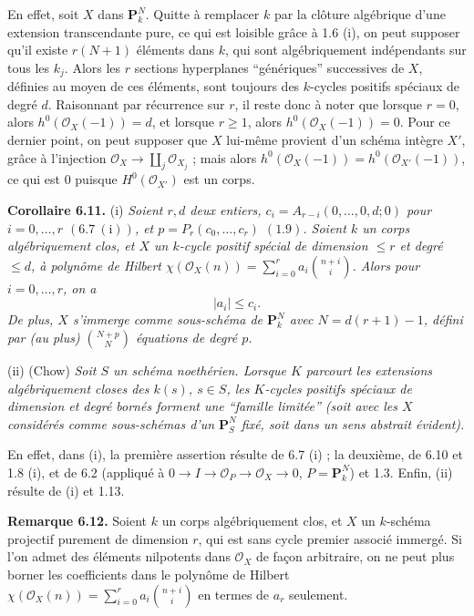 En
effet, soit $X$ dans $\mathbf P^N_k$. Quitte \`a remplacer $k$ par la cl\^oture alg\'ebrique d'une extension transcendante pure, ce qui est loisible gr\^ace \`a 1.6 (i), on peut supposer qu'il existe $r(N+1)$ \'el\'ements dans $k$, qui sont alg\'ebriquement ind\'ependants sur tous les $k_j$. Alors les $r$ sections hyperplanes ``g\'en\'eriques'' successives de $X$, d\'efinies au moyen de ces \'el\'ements, sont toujours des $k$-cycles positifs sp\'eciaux de degr\'e $d$. Raisonnant par r\'ecurrence sur $r$, il reste donc \`a noter que lorsque $r=0$, alors $h^0(\mathcal O_X(-1))=d$, et lorsque $r\ge1$, alors $h^0(\mathcal O_X(-1))=0$. Pour ce dernier point, on peut supposer que $X$ lui-m\^eme provient d'un sch\'ema int\`egre $X'$, gr\^ace \`a l'injection $\mathcal O_X\to \coprod_j\mathcal O_{X_j}$ ; mais alors $h^0(\mathcal O_X(-1))=h^0(\mathcal O_{X'}(-1))$, ce qui est $0$ puisque $H^0(\mathcal O_{X'})$ est un corps.

\textbf{Corollaire 6.11.} (i) \emph{Soient $r,d$ deux entiers, $c_i=A_{r-i}(0,\ldots,0,d;0)$ pour $i=0,\ldots,r$ $(6.7\ \mathrm{(i)})$, et $p=P_r(c_0,\ldots,c_r)$ $(1.9)$. Soient $k$ un corps alg\'ebriquement clos, et $X$ un $k$-cycle positif sp\'ecial de dimension $\le r$ et degr\'e $\le d$, \`a polyn\^ome de Hilbert $\chi(\mathcal O_X(n))=\sum_{i=0}^{r}a_i\binom{n+i}{i}$. Alors pour $i=0,\ldots,r$, on a}
\[
   |a_i|\le c_i.
\]
\emph{De plus, $X$ s'immerge comme sous-sch\'ema de $\mathbf P^N_k$ avec $N=d(r+1)-1$, d\'efini par (au plus) $\binom{N+p}{N}$ \'equations de degr\'e $p$.}

(ii) (Chow) \emph{Soit $S$ un sch\'ema noeth\'erien. Lorsque $K$ parcourt les extensions alg\'ebriquement closes des $k(s)$, $s\in S$, les $K$-cycles positifs sp\'eciaux de dimension et degr\'e born\'es forment une ``famille limit\'ee'' (soit avec les $X$ consid\'er\'es comme sous-sch\'emas d'un $\mathbf P^N_S$ fix\'e, soit dans un sens abstrait \'evident).}

En
effet, dans (i), la premi\`ere assertion r\'esulte de 6.7 (i) ; la deuxi\`eme, de 6.10 et 1.8 (i), et de 6.2 (appliqu\'e \`a $0\to I\to\mathcal O_P\to\mathcal O_X\to0$, $P=\mathbf P^N_k$) et 1.3. Enfin, (ii) r\'esulte de (i) et 1.13.

\textbf{Remarque 6.12.} Soient $k$ un corps alg\'ebriquement clos, et $X$ un $k$-sch\'ema projectif purement de dimension $r$, qui est sans cycle premier associ\'e immerg\'e. Si l'on admet des \'el\'ements nilpotents dans $\mathcal O_X$ de fa\c{c}on arbitraire, on ne peut plus borner les coefficients dans le polyn\^ome de Hilbert $\chi(\mathcal O_X(n))=\sum_{i=0}^{r}a_i\binom{n+i}{i}$ en termes de $a_r$ seulement.

